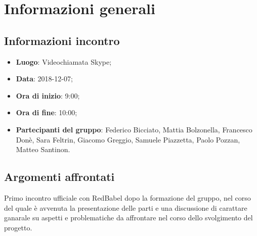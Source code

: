 \section{Informazioni generali}

\subsection{Informazioni incontro}
\begin{itemize}
\item \textbf{Luogo}: Videochiamata Skype;
\item \textbf{Data}: 2018-12-07;
\item \textbf{Ora di inizio}: 9:00;
\item \textbf{Ora di fine}: 10:00;
\item \textbf{Partecipanti del gruppo}: Federico Bicciato, Mattia Bolzonella, 
Francesco Donè, Sara Feltrin, Giacomo Greggio, Samuele Piazzetta, Paolo Pozzan, 
Matteo Santinon. 
\end{itemize}

\subsection{Argomenti affrontati}
Primo incontro ufficiale con RedBabel dopo la formazione del gruppo, nel corso del quale è avvenuta la presentazione delle parti e una discussione di carattare ganarale su aspetti e problematiche da affrontare nel corso dello svolgimento del progetto.
